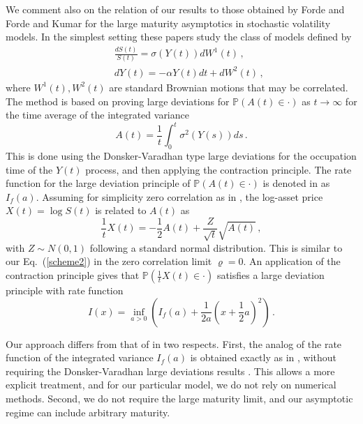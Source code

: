\documentclass[11pt]{article}
\numberwithin{equation}{section}
\theoremstyle{plain}
\begin{document}
We comment also on the relation of our results to those obtained by 
Forde \cite{FordeLargeTime} and Forde and Kumar \cite{FordeKumar} for the large 
maturity asymptotics in stochastic volatility models. In the simplest setting 
these papers study the class of models defined by
\begin{eqnarray}
&& \frac{dS(t)}{S(t)} = \sigma(Y(t)) dW^1(t)\,, \\
&& dY(t) = - \alpha Y(t) dt + dW^2(t)\,,
\end{eqnarray}
where $W^1(t),W^2(t)$ are standard Brownian motions that may be correlated. The method is based on proving
large deviations for $\mathbb{P}(A(t) \in \cdot)$ as $t\rightarrow\infty$ 
for the time average of the integrated variance
\begin{equation}
A(t) = \frac{1}{t} \int_0^t \sigma^2 (Y(s))ds\,.
\end{equation}
This is done using the Donsker-Varadhan type large deviations \cite{DonskerVaradhan} for the
occupation time of the $Y(t)$ process, and then applying the contraction
principle. The rate function for the large deviation principle of $\mathbb{P}(A(t) \in \cdot)$ 
is denoted in \cite{FordeKumar} as $I_f(a)$. 
Assuming for simplicity zero correlation as in \cite{FordeLargeTime},
the log-asset price
$X(t) = \log S(t)$ is related to $A(t)$ as
\begin{equation}
\frac{1}{t} X(t) = - \frac12 A(t) + \frac{Z}{\sqrt{t}} \sqrt{A(t)}\,,
\end{equation}
with $Z\sim N(0,1)$ following a standard normal distribution. 
This is similar to our Eq.~(\ref{scheme2}) in the zero correlation limit $\varrho=0$.
An application
of the contraction principle gives that $\mathbb{P}(\frac{1}{t} X(t) \in
\cdot)$ satisfies a large deviation principle with rate function
\begin{equation}
I(x) = \inf_{a>0} \left( I_f(a) + \frac{1}{2a} \left(x + \frac12 a\right)^2\right)\,.
\end{equation}

Our approach differs from that of \cite{FordeLargeTime,FordeKumar} in two 
respects. First, the analog of the rate function of the integrated variance 
$I_f(a)$ is obtained exactly as in \cite{PZDiscreteAsian}, 
without requiring the Donsker-Varadhan large deviations results \cite{DonskerVaradhan}. 
This allows a more explicit treatment, and for our particular model, 
we do not rely on numerical methods. Second, we do not 
require the large maturity limit, and our asymptotic regime can include 
arbitrary maturity.
\end{document}
